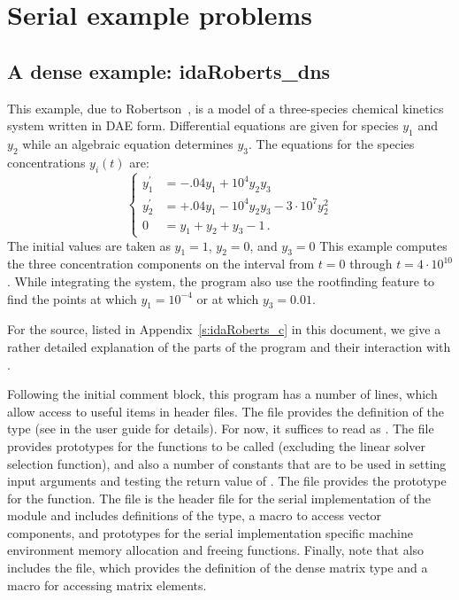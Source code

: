 \section{Serial example problems}\label{s:ex_serial}

\subsection{A dense example: idaRoberts\_dns}\label{ss:idaRoberts}

This example, due to Robertson~\cite{Rob:66}, is a model of a three-species 
chemical kinetics system written in DAE form. Differential equations are given 
for species $y_1$ and $y_2$ while an algebraic equation determines $y_3$. The 
equations for the species concentrations $y_i(t)$ are:
\begin{equation}\label{e:idaRoberts_DAE}
\begin{cases}
  y^\prime_1 &= -.04 y_1 + 10^4 y_2 y_3   \\
  y^\prime_2 &= +.04 y_1 - 10^4 y_2 y_3 - 3 \cdot 10^7 y_2^2  \\
  0 &=  y_1 + y_2 + y_3 - 1 \, .
\end{cases}
\end{equation}
The initial values are taken as $y_1 = 1$, $y_2 = 0$, and $y_3 = 0$
This example computes the three concentration components on the interval
from $t=0$ through $t=4 \cdot 10^{10}$.
While integrating the system, the program also use the rootfinding
feature to find the points at which $y_1 = 10^{-4}$ or at which
$y_3 = 0.01$.

For the source, listed in Appendix~\ref{s:idaRoberts_c} in this document,
we give a rather detailed explanation of the parts of the program and
their interaction with {\ida}.

Following the initial comment block, this program has a number
of  lines, which allow access to useful items in {\ida}
header files.  The  file provides the definition of the
type  (see  in the user guide \cite{ida_ug}
for details).  For now, it suffices to read  as .
The  file provides prototypes for the {\ida}
functions to be called (excluding the linear solver selection
function), and also a number of constants that are to be used in
setting input arguments and testing the return value of .
The  file provides the prototype for the  function.
The  file is the header file for the serial
implementation of the {\nvector} module and includes definitions of the 
 type, a macro to access vector components, and prototypes 
for the serial implementation specific machine environment memory allocation
and freeing functions.
Finally, note that  also includes the 
file, which provides the definition of the dense matrix type 
and a macro for accessing matrix elements.

